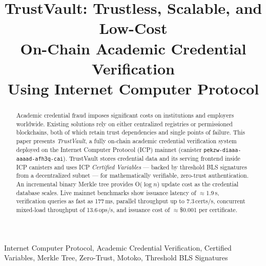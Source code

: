\documentclass[conference]{IEEEtran}
\begin{document}
\title{TrustVault: Trustless, Scalable, and Low-Cost\\On-Chain Academic Credential Verification\\Using Internet Computer Protocol}

\author{
  \and
}

\maketitle

\begin{abstract}
Academic credential fraud imposes significant costs on institutions and employers worldwide. Existing solutions rely on either centralized registries or permissioned blockchains, both of which retain trust dependencies and single points of failure. This paper presents \textit{TrustVault}, a fully on-chain academic credential verification system deployed on the Internet Computer Protocol (ICP) mainnet (canister \texttt{pekzw-diaaa-aaaad-afh3q-cai}). TrustVault stores credential data and its serving frontend inside ICP canisters and uses ICP \textit{Certified Variables} — backed by threshold BLS signatures from a decentralized subnet — for mathematically verifiable, zero-trust authentication. An incremental binary Merkle tree provides O($\log n$) update cost as the credential database scales. Live mainnet benchmarks show issuance latency of $\approx$1.9\,s, verification queries as fast as 177\,ms, parallel throughput up to 7.3\,certs/s, concurrent mixed-load throughput of 13.6\,ops/s, and issuance cost of $\approx$\$0.001 per certificate.
\end{abstract}

\begin{IEEEkeywords}
Internet Computer Protocol, Academic Credential Verification, Certified Variables, Merkle Tree, Zero-Trust, Motoko, Threshold BLS Signatures
\end{IEEEkeywords}
\end{document}
